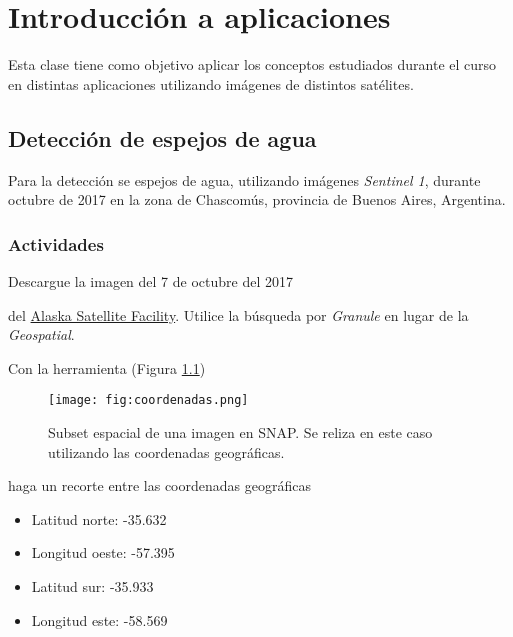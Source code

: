\chapter{Introducción a aplicaciones}
Esta clase tiene como objetivo aplicar los conceptos estudiados durante el curso en distintas aplicaciones utilizando imágenes de distintos satélites.

\section{Detección de espejos de agua}

Para la detección se espejos de agua, utilizando imágenes \emph{Sentinel 1}, durante octubre de 2017 en la zona de Chascomús, provincia de Buenos Aires, Argentina.



\subsection{Actividades}

\begin{que}
    Descargue la imagen del 7 de octubre del 2017
    \begin{center}\end{center} del \href{https://vertex.daac.asf.alaska.edu/}{Alaska Satellite Facility}. Utilice la búsqueda por \emph{Granule} en lugar de la \emph{Geospatial}.
\end{que}

\begin{que}
    Con la herramienta  (Figura \ref{fig:coordenadas})
    \begin{figure}[h!]
        \centering
        \texttt{[image: fig:coordenadas.png]}
        \caption{Subset espacial de una imagen en SNAP. Se reliza en este caso utilizando las coordenadas geográficas.}
        \label{fig:coordenadas}
    \end{figure}
    haga un recorte entre las coordenadas geográficas
    \begin{itemize}
        \item Latitud norte: -35.632
        \item Longitud oeste: -57.395
        \item Latitud sur: -35.933
        \item Longitud este: -58.569
    \end{itemize}
\end{que}

